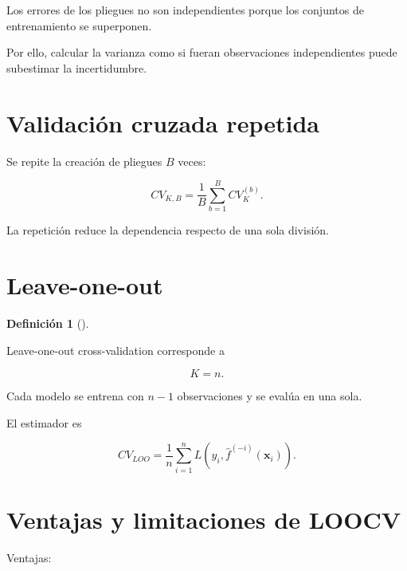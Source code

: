 \documentclass[
  spanish,
  10.5pt,
  letterpaper,
  DIV=11,
  numbers=noendperiod,
  oneside,
  open=any]{scrreprt}
\theoremstyle{definition}
\newtheorem{definition}{Definición}[chapter]
\theoremstyle{definition}
\theoremstyle{plain}
\theoremstyle{remark}
\begin{document}

Los errores de los pliegues no son independientes porque los conjuntos
de entrenamiento se superponen.

Por ello, calcular la varianza como si fueran observaciones
independientes puede subestimar la incertidumbre.

\section*{Validación cruzada
repetida}\label{validaciuxf3n-cruzada-repetida}


Se repite la creación de pliegues \(B\) veces:

\[
CV_{K,B}
=
\frac{1}{B}
\sum_{b=1}^{B}
CV_K^{(b)}.
\]

La repetición reduce la dependencia respecto de una sola división.

\section*{Leave-one-out}\label{leave-one-out}


\begin{definition}[]\protect\hypertarget{def-loocv}{}\label{def-loocv}

Leave-one-out cross-validation corresponde a

\[
K=n.
\]

\end{definition}

Cada modelo se entrena con \(n-1\) observaciones y se evalúa en una
sola.

El estimador es

\[
CV_{LOO}
=
\frac{1}{n}
\sum_{i=1}^{n}
L
\left(
y_i,
\widehat{f}^{(-i)}(\mathbf{x}_i)
\right).
\]

\section*{Ventajas y limitaciones de
LOOCV}\label{ventajas-y-limitaciones-de-loocv}


Ventajas:
\end{document}
